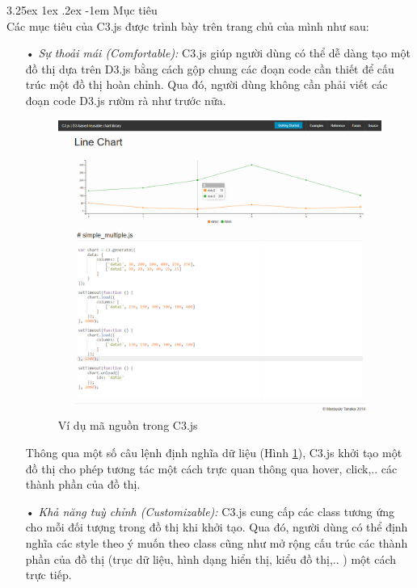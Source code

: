 \documentclass[12pt,a4paper]{article}
\makeatletter
\newcommand{\myparagraph}[1]{\paragraph{#1}\mbox{}\\} %
\renewcommand\paragraph{\@startsection{paragraph}{5}{\z@}%
  {3.25ex \@plus1ex \@minus.2ex}%
  {-1em}%
  {\normalfont\normalsize\bfseries}}
\makeatother
\begin{document}
\myparagraph{Mục tiêu}
Các mục tiêu của C3.js được trình bày trên trang chủ của mình như sau:
\begin{itemize}
\item[•] \emph{Sự thoải mái (Comfortable):} C3.js giúp người dùng có thể dễ dàng tạo một đồ thị dựa trên D3.js bằng cách gộp chung các đoạn code cần thiết để cấu trúc một đồ thị hoàn chỉnh. Qua đó, người dùng không cần phải viết các đoạn code D3.js rườm rà như trước nữa.
    
\begin{figure}[!h]
	\begin{center}
    \includegraphics[scale=.3]{image/c3syntax}
    \caption{Ví dụ mã nguồn trong C3.js}
    \label{fig:c3syntax}
	\end{center}
\end{figure}

Thông qua một số câu lệnh định nghĩa dữ liệu (Hình \ref{fig:c3syntax}), C3.js khởi tạo một đồ thị cho phép tương tác một cách trực quan thông qua hover, click,.. các thành phần của đồ thị.

\item[•] \emph{Khả năng tuỳ chỉnh (Customizable):} C3.js cung cấp các class tương ứng cho mỗi đối tượng trong đồ thị khi khởi tạo. Qua đó, người dùng có thể định nghĩa các style theo ý muốn theo class cũng như mở rộng cấu trúc các thành phần của đồ thị (trục dữ liệu, hình dạng hiển thị, kiểu đồ thị,.. ) một cách trực tiếp.
    

\end{itemize}
\end{document}
